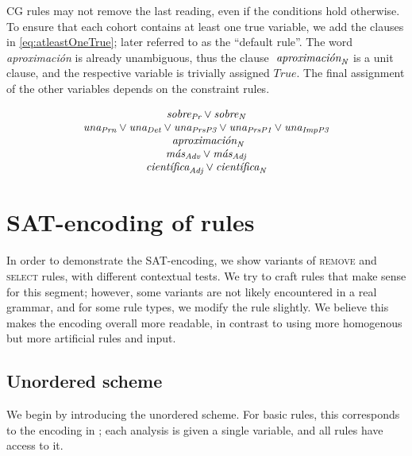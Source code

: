 CG rules may not remove the last reading, even if the conditions hold otherwise.
To ensure that each cohort contains at least one true variable, we add the clauses in \ref{eq:atleastOneTrue}; later referred to as the ``default rule''. 
The word \emph{aproximación} is already unambiguous, thus the clause $\text{ \em aproximaci\'{o}n}_{\text{\em N}}$ is a unit clause, and the respective variable is trivially assigned $True$. 
The final assignment of the other variables depends on the constraint rules.


\begin{equation}
\begin{array}{c}
\sobrePr \vee \sobreN \\
\unaPrn \vee \unaDet \vee \unaPrsPThree \vee \unaPrsPOne \vee \unaImp \\
\aproximacionN \\
\masAdv \vee \masAdj \\
\cientificaAdj \vee \cientificaN \\
\end{array}
\label{eq:atleastOneTrue}
\end{equation}


\section{SAT-encoding of rules}

In order to demonstrate the SAT-encoding, we show variants of \textsc{remove} and \textsc{select} rules, with different contextual tests. 
We try to craft rules that make sense for this segment; however, some variants are not likely encountered in a real grammar, and for some rule types, we modify the rule slightly. We believe this makes the encoding overall more readable, in contrast to using more homogenous but more artificial rules and input.


\subsection{Unordered scheme}

We begin by introducing the unordered scheme. For basic rules, this corresponds to the encoding in \cite{lager98}; each analysis is given a single variable, and all rules have access to it.

